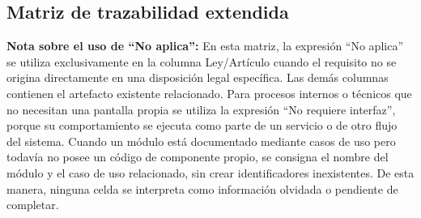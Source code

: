 \documentclass[11pt,a4paper]{article}
\begin{document}
\begin{longtable}{p{} p{} p{} p{} p{} p{} p{} p{}}
		\bottomrule
		
	\end{longtable}
	
	\endgroup
	
	\subsection{Matriz de trazabilidad extendida}
	
	\noindent\textbf{Nota sobre el uso de ``No aplica'':}
	En esta matriz, la expresión ``No aplica'' se utiliza exclusivamente en la columna Ley/Artículo cuando el requisito no se origina directamente en una disposición legal específica. Las demás columnas contienen el artefacto existente relacionado. Para procesos internos o técnicos que no necesitan una pantalla propia se utiliza la expresión ``No requiere interfaz'', porque su comportamiento se ejecuta como parte de un servicio o de otro flujo del sistema. Cuando un módulo está documentado mediante casos de uso pero todavía no posee un código de componente propio, se consigna el nombre del módulo y el caso de uso relacionado, sin crear identificadores inexistentes. De esta manera, ninguna celda se interpreta como información olvidada o pendiente de completar.
	
	
	\begingroup
	\scriptsize
	\renewcommand{\arraystretch}{1.15}
	\setlength{\LTleft}{-2cm}
	\setlength{\LTright}{0pt}
	
\end{document}
